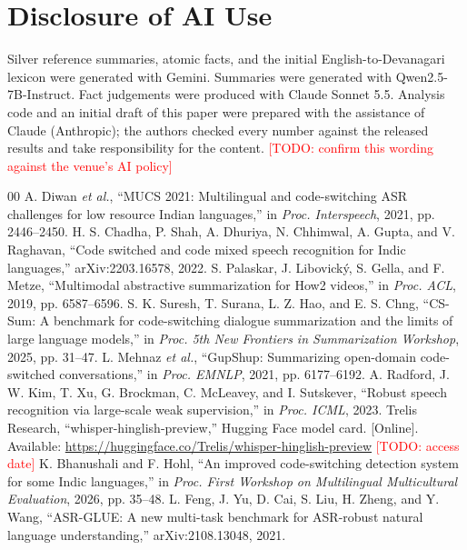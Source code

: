 \documentclass[conference]{IEEEtran}
\newcommand{\todo}[1]{\textcolor{red}{[TODO: #1]}}
\begin{document}
\section*{Disclosure of AI Use}
Silver reference summaries, atomic facts, and the initial English-to-Devanagari lexicon were generated with Gemini. Summaries were generated with Qwen2.5-7B-Instruct. Fact judgements were produced with Claude Sonnet 5.5. Analysis code and an initial draft of this paper were prepared with the assistance of Claude (Anthropic); the authors checked every number against the released results and take responsibility for the content. \todo{confirm this wording against the venue's AI policy}

\begin{thebibliography}{00}
 A. Diwan \textit{et al.}, ``MUCS 2021: Multilingual and code-switching ASR challenges for low resource Indian languages,'' in \textit{Proc. Interspeech}, 2021, pp. 2446--2450.
 H. S. Chadha, P. Shah, A. Dhuriya, N. Chhimwal, A. Gupta, and V. Raghavan, ``Code switched and code mixed speech recognition for Indic languages,'' arXiv:2203.16578, 2022.
 S. Palaskar, J. Libovick\'{y}, S. Gella, and F. Metze, ``Multimodal abstractive summarization for How2 videos,'' in \textit{Proc. ACL}, 2019, pp. 6587--6596.
 S. K. Suresh, T. Surana, L. Z. Hao, and E. S. Chng, ``CS-Sum: A benchmark for code-switching dialogue summarization and the limits of large language models,'' in \textit{Proc. 5th New Frontiers in Summarization Workshop}, 2025, pp. 31--47.
 L. Mehnaz \textit{et al.}, ``GupShup: Summarizing open-domain code-switched conversations,'' in \textit{Proc. EMNLP}, 2021, pp. 6177--6192.
 A. Radford, J. W. Kim, T. Xu, G. Brockman, C. McLeavey, and I. Sutskever, ``Robust speech recognition via large-scale weak supervision,'' in \textit{Proc. ICML}, 2023.
 Trelis Research, ``whisper-hinglish-preview,'' Hugging Face model card. [Online]. Available: \url{https://huggingface.co/Trelis/whisper-hinglish-preview} \todo{access date}
 K. Bhanushali and F. Hohl, ``An improved code-switching detection system for some Indic languages,'' in \textit{Proc. First Workshop on Multilingual Multicultural Evaluation}, 2026, pp. 35--48.
 L. Feng, J. Yu, D. Cai, S. Liu, H. Zheng, and Y. Wang, ``ASR-GLUE: A new multi-task benchmark for ASR-robust natural language understanding,'' arXiv:2108.13048, 2021.

\end{thebibliography}
\end{document}
